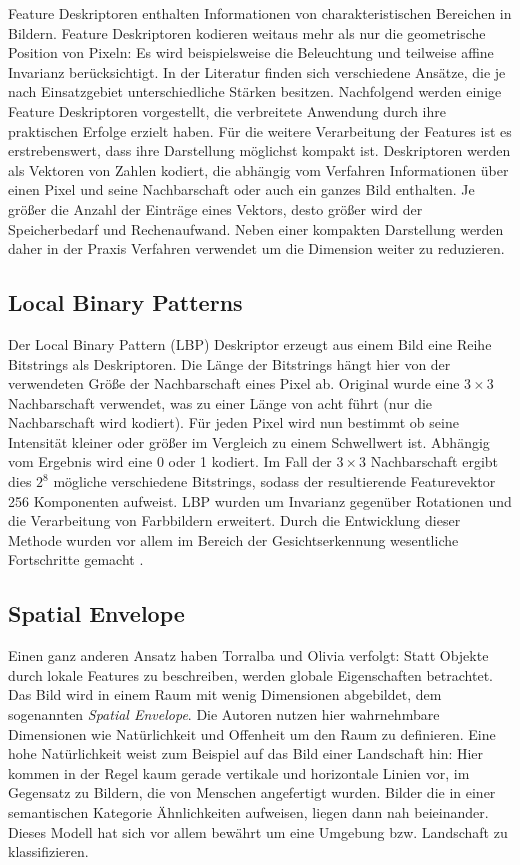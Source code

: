 Feature Deskriptoren enthalten Informationen von charakteristischen Bereichen in Bildern. Feature Deskriptoren kodieren weitaus mehr als nur die geometrische Position von Pixeln: Es wird beispielsweise die Beleuchtung und teilweise affine Invarianz berücksichtigt. In der Literatur finden sich verschiedene Ansätze, die je nach Einsatzgebiet unterschiedliche Stärken besitzen. Nachfolgend werden einige Feature Deskriptoren vorgestellt, die verbreitete Anwendung durch ihre praktischen Erfolge erzielt haben. Für die weitere Verarbeitung der Features ist es erstrebenswert, dass ihre Darstellung möglichst kompakt ist. Deskriptoren werden als Vektoren von Zahlen kodiert, die abhängig vom Verfahren Informationen über einen Pixel und seine Nachbarschaft oder auch ein ganzes Bild enthalten. Je größer die Anzahl der Einträge eines Vektors, desto größer wird der Speicherbedarf und Rechenaufwand. Neben einer kompakten Darstellung werden daher  in der Praxis Verfahren verwendet um die Dimension weiter zu reduzieren.


\subsection{Local Binary Patterns}

Der Local Binary Pattern (LBP) Deskriptor erzeugt aus einem Bild eine Reihe Bitstrings als Deskriptoren. Die Länge der Bitstrings hängt hier von der verwendeten Größe der Nachbarschaft eines Pixel ab. Original wurde eine $3 \times 3$ Nachbarschaft verwendet, was zu einer Länge von acht führt (nur die Nachbarschaft wird kodiert). Für jeden Pixel wird nun bestimmt ob seine Intensität kleiner oder größer im Vergleich zu einem Schwellwert ist. Abhängig vom Ergebnis wird eine 0 oder 1 kodiert. Im Fall der $3 \times 3$ Nachbarschaft ergibt dies $2^8$ mögliche verschiedene Bitstrings, sodass der resultierende Featurevektor 256 Komponenten aufweist. LBP wurden um Invarianz gegenüber Rotationen und die Verarbeitung von Farbbildern erweitert. Durch die Entwicklung dieser Methode wurden vor allem im Bereich der Gesichtserkennung wesentliche Fortschritte gemacht \cite{lbp2002}.

\subsection{Spatial Envelope}

Einen ganz anderen Ansatz haben Torralba und Olivia \cite{mts2001} verfolgt: Statt Objekte durch lokale Features zu beschreiben, werden globale Eigenschaften betrachtet. Das Bild wird in einem Raum mit wenig Dimensionen abgebildet, dem sogenannten \textit{Spatial Envelope}. Die Autoren nutzen hier wahrnehmbare Dimensionen wie Natürlichkeit und Offenheit um den Raum zu definieren. Eine hohe Natürlichkeit weist zum Beispiel auf das Bild einer Landschaft hin: Hier kommen in der Regel kaum gerade vertikale und horizontale Linien vor, im Gegensatz zu Bildern, die von Menschen angefertigt wurden.  Bilder die in einer semantischen Kategorie Ähnlichkeiten aufweisen, liegen dann nah beieinander. Dieses Modell hat sich vor allem bewährt um eine Umgebung bzw. Landschaft zu klassifizieren. 

